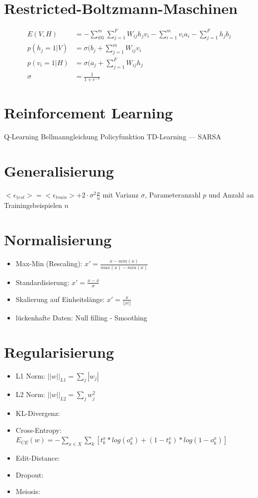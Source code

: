 \documentclass[paper=a4, fontsize=11pt]{scrartcl} %
\begin{document}
\section{Restricted-Boltzmann-Maschinen}
\begin{align*}
E(V, H) &= - \sum_{i01}^m \sum_{j=1}^F W_{ij} h_j v_i - \sum_{i=1}^m v_i a_i - \sum_{j=1}^F h_j b_j \\
p(h_j = 1 | V) &= \sigma(b_j + \sum_{j=1}^m W_{ij}v_i \\
p(v_i = 1 | H) &= \sigma(a_j + \sum_{j=1}^F W_{ij}h_j \\
\sigma &= \frac{1}{1+e^{-x}}
\end{align*}

\section{Reinforcement Learning}

Q-Learning
Bellmanngleichung
Policyfunktion
TD-Learning ---
SARSA

\section{Generalisierung}

$<\epsilon_{†est}> = <\epsilon_{train}> + 2 \cdot \sigma^2 \frac{p}{n}$ mit Varianz $\sigma$, Parameteranzahl $p$ und Anzahl an Trainingsbeispielen $n$


\section{Normalisierung}

\begin{itemize}
\item Max-Min (Rescaling): $x' = \frac{x - min(x)}{max(x) - min(x)}$
\item Standardisierung: $x' = \frac{x - \bar{x}}{\sigma}$
\item Skalierung auf Einheitslänge: $x' = \frac{x}{||x||}$
\item lückenhafte Daten: Null filling - Smoothing
\end{itemize}

\section{Regularisierung}

\begin{itemize}
\item L1 Norm: $||w||_{L1} = \sum\limits_j |w_j|$
\item L2 Norm: $||w||_{L2} = \sum\limits_j w^2_j$
\item KL-Divergenz:
\item Cross-Entropy: $E_{CE}(w) = - \sum\limits_{x \in X} \sum\limits_k [t^x_k * log(o^x_k) + (1-t^x_k)*log(1-o^x_k)]$
\item Edit-Distance: 
\item Dropout: 
\item Meiosis: 
\end{itemize}
\end{document}
